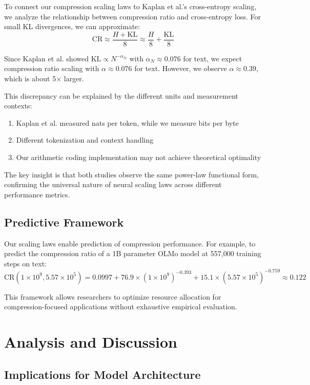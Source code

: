 \documentclass[10pt]{article} %
\begin{document}
To connect our compression scaling laws to Kaplan et al.'s cross-entropy scaling, we analyze the relationship between compression ratio and cross-entropy loss. For small KL divergences, we can approximate:
\[
\mathrm{CR} \approx \frac{H + \mathrm{KL}}{8} \approx \frac{H}{8} + \frac{\mathrm{KL}}{8}
\]

Since Kaplan et al. showed $\mathrm{KL} \propto N^{-\alpha_N}$ with $\alpha_N \approx 0.076$ for text, we expect compression ratio scaling with $\alpha \approx 0.076$ for text. However, we observe $\alpha \approx 0.39$, which is about 5× larger.

This discrepancy can be explained by the different units and measurement contexts:
\begin{enumerate}
\item Kaplan et al. measured nats per token, while we measure bits per byte
\item Different tokenization and context handling
\item Our arithmetic coding implementation may not achieve theoretical optimality
\end{enumerate}

The key insight is that both studies observe the same power-law functional form, confirming the universal nature of neural scaling laws across different performance metrics.

\subsection{Predictive Framework}

Our scaling laws enable prediction of compression performance. For example, to predict the compression ratio of a 1B parameter OLMo model at 557,000 training steps on text:
\[
\mathrm{CR}(1 \times 10^9, 5.57 \times 10^5) = 0.0997 + 76.9 \times (1 \times 10^9)^{-0.393} + 15.1 \times (5.57 \times 10^5)^{-0.759} \approx 0.122
\]

This framework allows researchers to optimize resource allocation for compression-focused applications without exhaustive empirical evaluation.

\section{Analysis and Discussion}

\subsection{Implications for Model Architecture}
\end{document}
